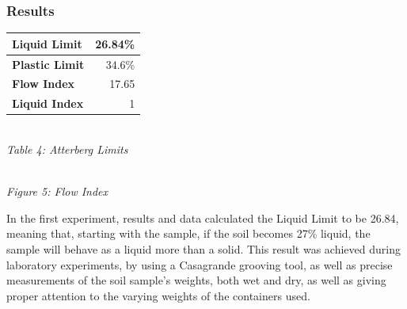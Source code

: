 \documentclass{article}
\begin{document}
\subsubsection{Results}
\begin{center}
    \begin{tabular}{|l|r|}
        \hline 
        \textbf{Liquid Limit} & 26.84\%\\\hline
        \textbf{Plastic Limit} & 34.6\%\\\hline
        \textbf{Flow Index} & 17.65\\\hline
        \textbf{Liquid Index} & 1\\\hline
    \end{tabular}
    \vspace{3mm}
    \emph{\\Table 4: Atterberg Limits}
\end{center}
\begin{center}  
    \pgfplotsset{width=10cm}
    \vspace{3mm}
    \emph{\\Figure 5: Flow Index}
\end{center}
\par In the first experiment, results and data calculated the Liquid Limit to be 26.84, meaning that, starting with the sample, if the soil becomes 27\% liquid, the sample will behave as a liquid more than a solid. This result was achieved during laboratory experiments, by using a Casagrande grooving tool, as well as precise measurements of the soil sample's weights, both wet and dry, as well as giving proper attention to the varying weights of the containers used.  
\end{document}
